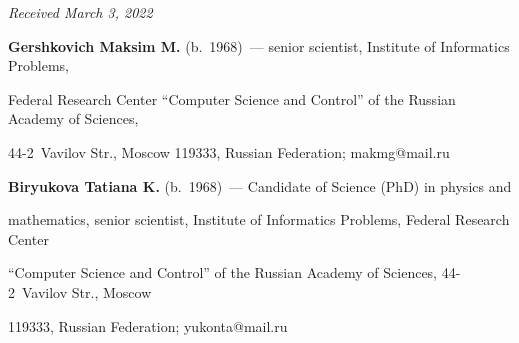 \hfill{\small\textit{Received March 3, 2022}} 










\Contr





\noindent


\textbf{Gershkovich Maksim M.} (b.\ 1968)~--- senior scientist, Institute of Informatics Problems, 


Federal Research Center ``Computer Science and Control'' of the Russian Academy of Sciences,  


44-2~Vavilov Str., Moscow 119333, Russian Federation; \mbox{makmg@mail.ru}





\vspace*{3pt}





\noindent


\textbf{Biryukova Tatiana K.} (b.\ 1968)~--- Candidate of Science (PhD) in physics and 


mathematics, senior scientist, Institute of Informatics Problems, Federal Research Center 


``Computer Science and Control'' of the Russian Academy of Sciences, 44-2~Vavilov Str., Moscow 


119333, Russian Federation; \mbox{yukonta@mail.ru}


       


 


\label{end\stat}





\renewcommand{\bibname}{\protect\rm Литература} 


